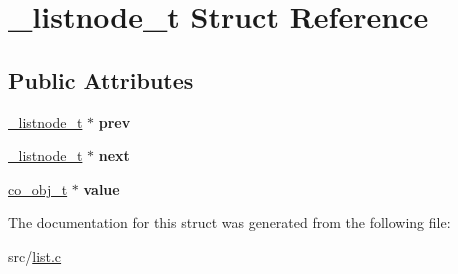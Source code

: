 \hypertarget{struct__listnode__t}{\section{\-\_\-listnode\-\_\-t Struct Reference}
\label{struct__listnode__t}
}
\subsection*{Public Attributes}
\begin{DoxyCompactItemize}
\item 
\hypertarget{struct__listnode__t_a5eba0591bc2c2dce2a29e15946efc748}{\hyperlink{struct__listnode__t}{\-\_\-listnode\-\_\-t} $\ast$ {\bfseries prev}}\label{struct__listnode__t_a5eba0591bc2c2dce2a29e15946efc748}

\item 
\hypertarget{struct__listnode__t_ae362dd930c62b55ac9efd3ae9c6e60cf}{\hyperlink{struct__listnode__t}{\-\_\-listnode\-\_\-t} $\ast$ {\bfseries next}}\label{struct__listnode__t_ae362dd930c62b55ac9efd3ae9c6e60cf}

\item 
\hypertarget{struct__listnode__t_a66185218b29346d0ad6c378d303ec54c}{\hyperlink{structco__obj__t}{co\-\_\-obj\-\_\-t} $\ast$ {\bfseries value}}\label{struct__listnode__t_a66185218b29346d0ad6c378d303ec54c}

\end{DoxyCompactItemize}


The documentation for this struct was generated from the following file\-:\begin{DoxyCompactItemize}
\item 
src/\hyperlink{list_8c}{list.\-c}\end{DoxyCompactItemize}
